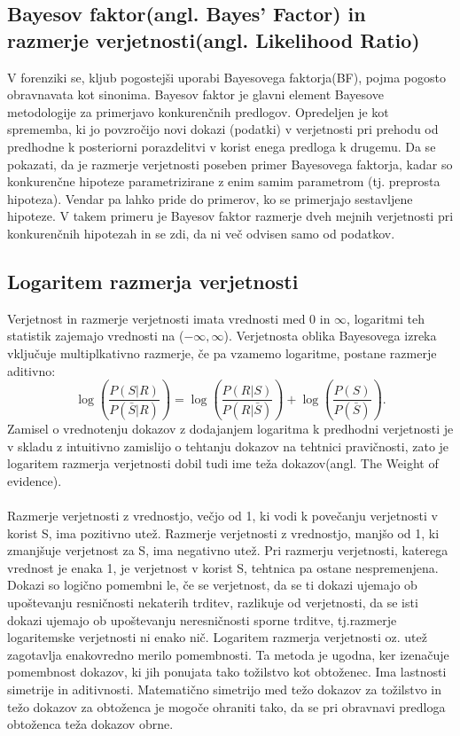 \documentclass[12pt,a4paper]{amsart}
\theoremstyle{definition} %
\theoremstyle{plain} %
\begin{document}
\subsection{Bayesov faktor(angl. Bayes' Factor) in razmerje verjetnosti(angl. Likelihood Ratio)}
V forenziki se, kljub pogostejši uporabi Bayesovega faktorja(BF), pojma pogosto obravnavata kot sinonima. Bayesov faktor je glavni element Bayesove metodologije za primerjavo konkurenčnih predlogov. Opredeljen je kot sprememba, ki jo povzročijo novi 
dokazi (podatki) v verjetnosti pri prehodu od predhodne k posteriorni porazdelitvi v korist enega predloga k drugemu. Da se pokazati, da je razmerje verjetnosti poseben primer Bayesovega faktorja, kadar so konkurenčne hipoteze parametrizirane z 
enim samim parametrom (tj. preprosta hipoteza). Vendar pa lahko pride do primerov, ko se primerjajo sestavljene hipoteze. V takem primeru je Bayesov faktor razmerje dveh mejnih verjetnosti pri konkurenčnih hipotezah in se zdi, da ni več odvisen samo od podatkov. 

\subsection{Logaritem razmerja verjetnosti}
Verjetnost in razmerje verjetnosti imata vrednosti med 0 in $\infty$, logaritmi teh statistik zajemajo vrednosti na ($-\infty, \infty$). Verjetnosta oblika Bayesovega izreka vključuje multiplkativno razmerje, če pa vzamemo logaritme, postane razmerje aditivno:
\[
    \log{\left(\frac{P(S \lvert R)}{P(\bar{S} \lvert R)}\right)} = \log{\left(\frac{P(R \lvert S)}{P(R \lvert \bar{S})}\right)} + \log{\left(\frac{P(S)}{P(\bar{S})}\right)}.
\]
Zamisel o vrednotenju dokazov z dodajanjem logaritma k predhodni verjetnosti je v skladu z intuitivno zamislijo o tehtanju dokazov na tehtnici pravičnosti, zato je logaritem razmerja verjetnosti dobil tudi ime teža dokazov(angl. The Weight of evidence).\\\\
Razmerje verjetnosti z vrednostjo, večjo od 1, ki vodi k povečanju verjetnosti v korist S, ima pozitivno utež. Razmerje verjetnosti z vrednostjo, manjšo od 1, ki zmanjšuje verjetnost za S, ima negativno utež. Pri razmerju verjetnosti, katerega vrednost je enaka 1, 
je verjetnost v korist S, tehtnica pa ostane nespremenjena. Dokazi so logično pomembni le, če se verjetnost, da se ti dokazi ujemajo ob upoštevanju resničnosti nekaterih trditev, razlikuje od verjetnosti, da se isti dokazi ujemajo ob upoštevanju neresničnosti 
sporne trditve, tj.razmerje logaritemske verjetnosti ni enako nič. Logaritem razmerja verjetnosti oz. utež zagotavlja enakovredno merilo pomembnosti. Ta metoda je ugodna, ker izenačuje pomembnost dokazov, ki jih ponujata tako tožilstvo kot obtoženec. Ima lastnosti simetrije 
in aditivnosti. Matematično simetrijo med težo dokazov za tožilstvo in težo dokazov za obtoženca je mogoče ohraniti tako, da se pri obravnavi predloga obtoženca teža dokazov obrne.
\end{document}
